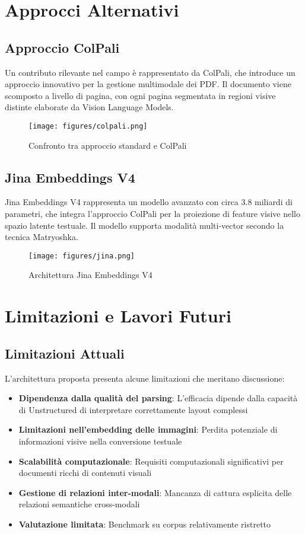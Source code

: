 \documentclass[12pt,a4paper]{article}
\begin{document}
\section{Approcci Alternativi}

\subsection{Approccio ColPali}
Un contributo rilevante nel campo è rappresentato da ColPali, che introduce un approccio innovativo per la gestione multimodale dei PDF. Il documento viene scomposto a livello di pagina, con ogni pagina segmentata in regioni visive distinte elaborate da Vision Language Models.

\begin{figure}[!ht]
\centering
\texttt{[image: figures/colpali.png]}
\caption{Confronto tra approccio standard e ColPali}
\label{fig:colpali_comparison}
\end{figure}

\subsection{Jina Embeddings V4}
Jina Embeddings V4 rappresenta un modello avanzato con circa 3.8 miliardi di parametri, che integra l'approccio ColPali per la proiezione di feature visive nello spazio latente testuale. Il modello supporta modalità multi-vector secondo la tecnica Matryoshka.

\begin{figure}[!ht]
\centering
\texttt{[image: figures/jina.png]}
\caption{Architettura Jina Embeddings V4}
\label{fig:jina_architecture}
\end{figure}

\section{Limitazioni e Lavori Futuri}

\subsection{Limitazioni Attuali}
L'architettura proposta presenta alcune limitazioni che meritano discussione:

\begin{itemize}
    \item \textbf{Dipendenza dalla qualità del parsing}: L'efficacia dipende dalla capacità di Unstructured di interpretare correttamente layout complessi
    \item \textbf{Limitazioni nell'embedding delle immagini}: Perdita potenziale di informazioni visive nella conversione testuale
    \item \textbf{Scalabilità computazionale}: Requisiti computazionali significativi per documenti ricchi di contenuti visuali
    \item \textbf{Gestione di relazioni inter-modali}: Mancanza di cattura esplicita delle relazioni semantiche cross-modali
    \item \textbf{Valutazione limitata}: Benchmark su corpus relativamente ristretto
\end{itemize}
\end{document}
